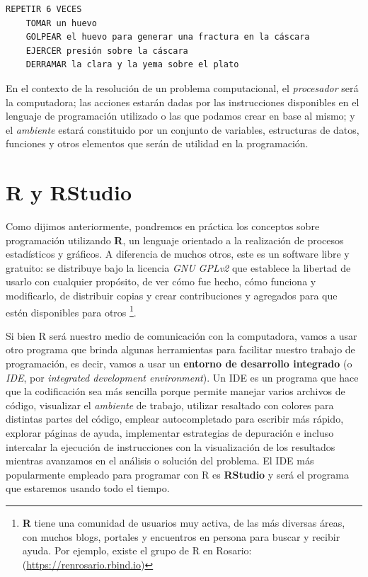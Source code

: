 \documentclass[
]{book}
\begin{document}
\begin{verbatim}
REPETIR 6 VECES
    TOMAR un huevo
    GOLPEAR el huevo para generar una fractura en la cáscara
    EJERCER presión sobre la cáscara
    DERRAMAR la clara y la yema sobre el plato
\end{verbatim}

En el contexto de la resolución de un problema computacional, el \emph{procesador} será la computadora; las acciones estarán dadas por las instrucciones disponibles en el lenguaje de programación utilizado o las que podamos crear en base al mismo; y el \emph{ambiente} estará constituido por un conjunto de variables, estructuras de datos, funciones y otros elementos que serán de utilidad en la programación.

\hypertarget{r-y-rstudio}{%
\section{R y RStudio}\label{r-y-rstudio}}

Como dijimos anteriormente, pondremos en práctica los conceptos sobre programación utilizando \textbf{R}, un lenguaje orientado a la realización de procesos estadísticos y gráficos. A diferencia de muchos otros, este es un software libre y gratuito: se distribuye bajo la licencia \emph{GNU GPLv2} que establece la libertad de usarlo con cualquier propósito, de ver cómo fue hecho, cómo funciona y modificarlo, de distribuir copias y crear contribuciones y agregados para que estén disponibles para otros \footnote{\textbf{R} tiene una comunidad de usuarios muy activa, de las más diversas áreas, con muchos blogs, portales y encuentros en persona para buscar y recibir ayuda. Por ejemplo, existe el grupo de R en Rosario: (\url{https://renrosario.rbind.io})}.

Si bien R será nuestro medio de comunicación con la computadora, vamos a usar otro programa que brinda algunas herramientas para facilitar nuestro trabajo de programación, es decir, vamos a usar un \textbf{entorno de desarrollo integrado} (o \emph{IDE}, por \emph{integrated development environment}). Un IDE es un programa que hace que la codificación sea más sencilla porque permite manejar varios archivos de código, visualizar el \emph{ambiente} de trabajo, utilizar resaltado con colores para distintas partes del código, emplear autocompletado para escribir más rápido, explorar páginas de ayuda, implementar estrategias de depuración e incluso intercalar la ejecución de instrucciones con la visualización de los resultados mientras avanzamos en el análisis o solución del problema. El IDE más popularmente empleado para programar con R es \textbf{RStudio} y será el programa que estaremos usando todo el tiempo.
\end{document}
